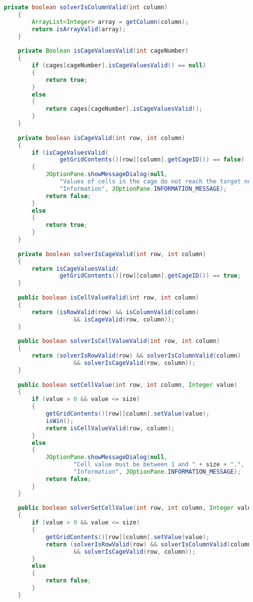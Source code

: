 \begin{lstlisting}[language=Java,basicstyle=\tiny,caption=Grid.java]
    private boolean solverIsColumnValid(int column)
    {
        ArrayList<Integer> array = getColumn(column);
        return isArrayValid(array);
    }
    
    private Boolean isCageValuesValid(int cageNumber)
    {
        if (cages[cageNumber].isCageValuesValid() == null)
        {
            return true;
        }
        else
        {
            return cages[cageNumber].isCageValuesValid();
        }
    }
    
    private boolean isCageValid(int row, int column)
    {
        if (isCageValuesValid(
                getGridContents()[row][column].getCageID()) == false)
        {
            JOptionPane.showMessageDialog(null, 
                "Values of cells in the cage do not reach the target number.",
                "Information", JOptionPane.INFORMATION_MESSAGE);
            return false;
        }
        else
        {
            return true;
        }
    }
    
    private boolean solverIsCageValid(int row, int column)
    {
        return isCageValuesValid(
                getGridContents()[row][column].getCageID()) == true;
    }
    
    public boolean isCellValueValid(int row, int column)
    {
        return (isRowValid(row) && isColumnValid(column) 
                    && isCageValid(row, column));
    }
    
    public boolean solverIsCellValueValid(int row, int column)
    {
        return (solverIsRowValid(row) && solverIsColumnValid(column) 
                    && solverIsCageValid(row, column));
    }
    
    public boolean setCellValue(int row, int column, Integer value)
    {
        if (value > 0 && value <= size)
        {
            getGridContents()[row][column].setValue(value);
            isWin();
            return isCellValueValid(row, column);
        }
        else
        {
            JOptionPane.showMessageDialog(null, 
                    "Cell value must be between 1 and " + size + ".",
                    "Information", JOptionPane.INFORMATION_MESSAGE);
            return false;
        }   
    }
    
    public boolean solverSetCellValue(int row, int column, Integer value)
    {
        if (value > 0 && value <= size)
        {
            getGridContents()[row][column].setValue(value);
            return (solverIsRowValid(row) && solverIsColumnValid(column) 
                    && solverIsCageValid(row, column));
        }
        else
        {
            return false;
        }   
    }
    

\end{lstlisting}
